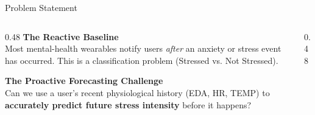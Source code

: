 \documentclass[aspectratio=169, xcolor={dvipsnames,table}]{beamer}
\begin{document}
\begin{frame}{Problem Statement}
\begin{columns}[T]
    \begin{column}{0.48\textwidth}
        \textbf{The Reactive Baseline}\\[0.2cm]
        Most mental-health wearables notify users \textit{after} an anxiety or stress event has occurred. This is a classification problem (Stressed vs. Not Stressed).
        \vspace{0.4cm}
        
        \textbf{The Proactive Forecasting Challenge}\\[0.2cm]
        Can we use a user's recent physiological history (EDA, HR, TEMP) to \textbf{accurately predict future stress intensity} before it happens?
    \end{column}
    \begin{column}{0.48\textwidth}
    \end{column}
\end{columns}
\end{frame}
\end{document}
